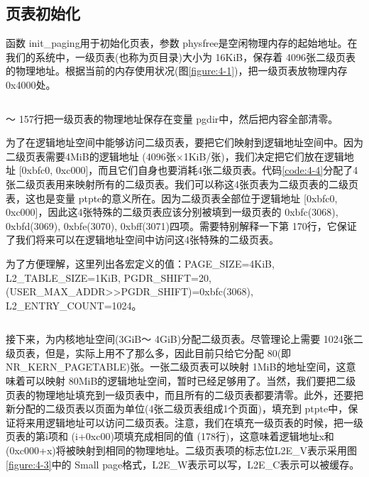 \documentclass[main.tex]{subfiles}
\begin{document}
\begin{CJK*}{UTF8}{song}
\section{页表初始化}
函数 init\_\-paging用于初始化页表，参数 phys\-free是空闲物理内存的起始地址。在我们的系统中，一级页表(也称为页目录)大小为 16\-KiB，保存着 4096张二级页表的物理地址。根据当前的内存使用状况(图\ref{figure:4-1})，把一级页表放物理内存 0x4000处。

\begin{code}
\label{code:4-3}
\inputminted[firstline=145,lastline=157,linenos,numbersep=5pt,frame=lines,framesep=2mm]{c}{src/chapter04/kernel/machdep.c}
\end{code}

～ 157行把一级页表的物理地址保存在变量 pgdir中，然后把内容全部清零。

\par
为了在逻辑地址空间中能够访问二级页表，要把它们映射到逻辑地址空间中。因为二级页表需要4MiB的逻辑地址 (4096张$\times$1\-KiB/张)，我们决定把它们放在逻辑地址 [0xbfc0, 0xc000]，而且它们自身也要消耗4张二级页表。代码\ref{code:4-4}分配了4张二级页表用来映射所有的二级页表。我们可以称这4张页表为二级页表的二级页表，这也是变量 ptpte的意义所在。因为二级页表全部位于逻辑地址 [0xbfc0, 0xc000]，因此这4张特殊的二级页表应该分别被填到一级页表的 0xbfc(3068), 0xbfd(3069), 0xbfe(3070), 0xbff(3071)四项。需要特别解释一下第 170行，它保证了我们将来可以在逻辑地址空间中访问这4张特殊的二级页表。

\par
为了方便理解，这里列出各宏定义的值：PAGE\_\-SIZE=4\-KiB, L2\_\-TABLE\_\-SIZE=1\-KiB, PGDR\_\-SHIFT=20, (USER\_\-MAX\_\-ADDR\-\textgreater\textgreater\-PGDR\_\-SHIFT)=0xbfc(3068), L2\_\-ENTRY\_\-COUNT=1024。

\begin{code}
\label{code:4-4}
\inputminted[firstline=159,lastline=170,linenos,numbersep=5pt,frame=lines,framesep=2mm]{c}{src/chapter04/kernel/machdep.c}
\end{code}

接下来，为内核地址空间(3\-GiB～ 4\-GiB)分配二级页表。尽管理论上需要 1024张二级页表，但是，实际上用不了那么多，因此目前只给它分配 80(即 NR\_\-KERN\_\-PAGETABLE)张。一张二级页表可以映射 1\-MiB的地址空间，这意味着可以映射 80\-MiB的逻辑地址空间，暂时已经足够用了。当然，我们要把二级页表的物理地址填充到一级页表中，而且所有的二级页表都要清零。此外，还要把新分配的二级页表以页面为单位(4张二级页表组成1个页面)，填充到 ptpte中，保证将来用逻辑地址可以访问二级页表。注意，我们在填充一级页表的时候，把一级页表的第i项和 (i+0xc00)项填充成相同的值 (178行)，这意味着逻辑地址x和 (0xc000+x)将被映射到相同的物理地址。二级页表项的标志位L2E\_\-V表示采用图\ref{figure:4-3}中的 Small page格式，L2E\_\-W表示可以写，L2E\_\-C表示可以被缓存。


\end{CJK*}
\end{document}
